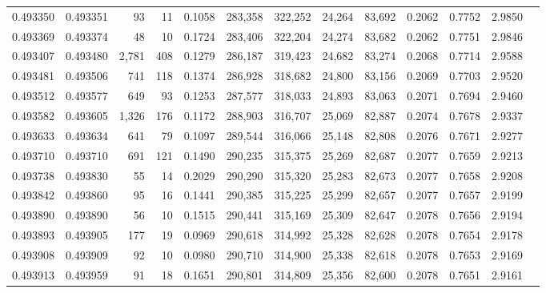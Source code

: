 \begin{tabular}{rrrrrrrrrrrrr}
0.493350 & 0.493351 &    93 &    11 &                                     0.1058 & 283,358 & 322,252 &  24,264 &  83,692 & 0.2062 & 0.7752 & 2.9850 \\
0.493369 & 0.493374 &    48 &    10 &                                     0.1724 & 283,406 & 322,204 &  24,274 &  83,682 & 0.2062 & 0.7751 & 2.9846 \\
0.493407 & 0.493480 & 2,781 &   408 &                                     0.1279 & 286,187 & 319,423 &  24,682 &  83,274 & 0.2068 & 0.7714 & 2.9588 \\
0.493481 & 0.493506 &   741 &   118 &                                     0.1374 & 286,928 & 318,682 &  24,800 &  83,156 & 0.2069 & 0.7703 & 2.9520 \\
0.493512 & 0.493577 &   649 &    93 &                                     0.1253 & 287,577 & 318,033 &  24,893 &  83,063 & 0.2071 & 0.7694 & 2.9460 \\
0.493582 & 0.493605 & 1,326 &   176 &                                     0.1172 & 288,903 & 316,707 &  25,069 &  82,887 & 0.2074 & 0.7678 & 2.9337 \\
0.493633 & 0.493634 &   641 &    79 &                                     0.1097 & 289,544 & 316,066 &  25,148 &  82,808 & 0.2076 & 0.7671 & 2.9277 \\
0.493710 & 0.493710 &   691 &   121 &                                     0.1490 & 290,235 & 315,375 &  25,269 &  82,687 & 0.2077 & 0.7659 & 2.9213 \\
0.493738 & 0.493830 &    55 &    14 &                                     0.2029 & 290,290 & 315,320 &  25,283 &  82,673 & 0.2077 & 0.7658 & 2.9208 \\
0.493842 & 0.493860 &    95 &    16 &                                     0.1441 & 290,385 & 315,225 &  25,299 &  82,657 & 0.2077 & 0.7657 & 2.9199 \\
0.493890 & 0.493890 &    56 &    10 &                                     0.1515 & 290,441 & 315,169 &  25,309 &  82,647 & 0.2078 & 0.7656 & 2.9194 \\
0.493893 & 0.493905 &   177 &    19 &                                     0.0969 & 290,618 & 314,992 &  25,328 &  82,628 & 0.2078 & 0.7654 & 2.9178 \\
0.493908 & 0.493909 &    92 &    10 &                                     0.0980 & 290,710 & 314,900 &  25,338 &  82,618 & 0.2078 & 0.7653 & 2.9169 \\
0.493913 & 0.493959 &    91 &    18 &                                     0.1651 & 290,801 & 314,809 &  25,356 &  82,600 & 0.2078 & 0.7651 & 2.9161 \\

\end{tabular}
